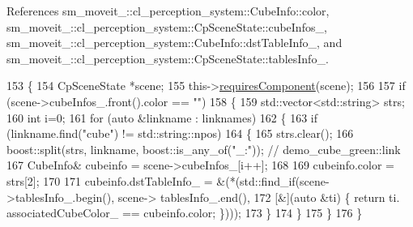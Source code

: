 References sm\+\_\+moveit\+\_\+::cl\+\_\+perception\+\_\+system\+::\+Cube\+Info\+::color, sm\+\_\+moveit\+\_\+::cl\+\_\+perception\+\_\+system\+::\+Cp\+Scene\+State\+::cube\+Infos\+\_\+, sm\+\_\+moveit\+\_\+::cl\+\_\+perception\+\_\+system\+::\+Cube\+Info\+::dst\+Table\+Info\+\_\+, and sm\+\_\+moveit\+\_\+::cl\+\_\+perception\+\_\+system\+::\+Cp\+Scene\+State\+::tables\+Info\+\_\+.


\begin{DoxyCode}
153             \{
154                 CpSceneState *scene;
155                 this->\hyperlink{classsmacc_1_1ISmaccComponent_aa06d58b1dcec3c513ca2edddfd3847ec}{requiresComponent}(scene);
156 
157                 \textcolor{keywordflow}{if} (scene->cubeInfos\_.front().color == \textcolor{stringliteral}{""})
158                 \{
159                     std::vector<std::string> strs;
160                     \textcolor{keywordtype}{int} i=0;
161                     \textcolor{keywordflow}{for} (\textcolor{keyword}{auto} &linkname : linknames)
162                     \{
163                         \textcolor{keywordflow}{if} (linkname.find(\textcolor{stringliteral}{"cube"}) != std::string::npos)
164                         \{
165                             strs.clear();
166                             boost::split(strs, linkname, boost::is\_any\_of(\textcolor{stringliteral}{"\_:"})); \textcolor{comment}{// demo\_cube\_green::link}
167                             CubeInfo& cubeinfo = scene->cubeInfos\_[i++];
168 
169                             cubeinfo.color = strs[2];
170 
171                             cubeinfo.dstTableInfo\_ = &(*(std::find\_if(scene->tablesInfo\_.begin(), scene->
      tablesInfo\_.end(),
172                                                                       [&](\textcolor{keyword}{auto} &ti) \{ \textcolor{keywordflow}{return} ti.
      associatedCubeColor\_ == cubeinfo.color; \})));
173                         \}
174                     \}
175                 \}
176             \}
\end{DoxyCode}
\mbox{\label{classsm__moveit__4_1_1cl__perception__system_1_1CpSimulatedGazeboPerception_adebc30f6b1fc905f783de3f7bdf4a711}} 
